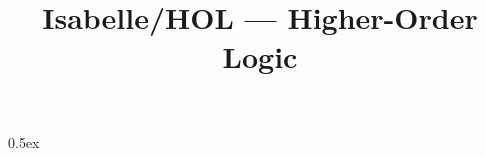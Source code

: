 \documentclass[11pt,a4paper]{article}
\begin{document}
\title{Isabelle/HOL --- Higher-Order Logic}
\maketitle

\tableofcontents

\parindent 0pt\parskip 0.5ex

\end{document}
